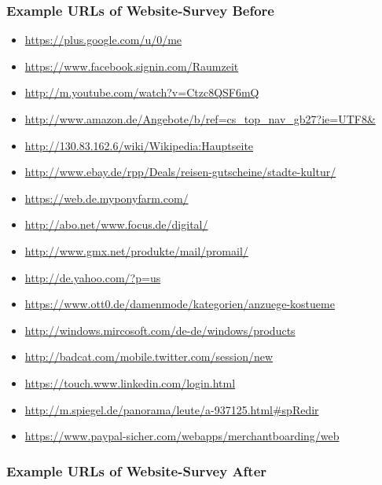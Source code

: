 \subsubsection{Example URLs of Website-Survey Before}
\label{example_urls_before}
\begin{itemize}
\item \url{https://plus.google.com/u/0/me}
\item \url{https://www.facebook.signin.com/Raumzeit}
\item \url{http://m.youtube.com/watch?v=Ctzc8QSF6mQ}
\item \url{http://www.amazon.de/Angebote/b/ref=cs_top_nav_gb27?ie=UTF8&}
\item \url{http://130.83.162.6/wiki/Wikipedia:Hauptseite}
\item \url{http://www.ebay.de/rpp/Deals/reisen-gutscheine/stadte-kultur/}
\item \url{https://web.de.myponyfarm.com/}
\item \url{http://abo.net/www.focus.de/digital/}
\item \url{http://www.gmx.net/produkte/mail/promail/}
\item \url{http://de.yahoo.com/?p=us}
\item \url{https://www.ott0.de/damenmode/kategorien/anzuege-kostueme}
\item \url{http://windows.mircosoft.com/de-de/windows/products}
\item \url{http://badcat.com/mobile.twitter.com/session/new}
\item \url{https://touch.www.linkedin.com/login.html}
\item \url{http://m.spiegel.de/panorama/leute/a-937125.html#spRedir}
\item \url{https://www.paypal-sicher.com/webapps/merchantboarding/web}
\end{itemize}


\subsubsection{Example URLs of Website-Survey After}
\label{example_urls_after}

